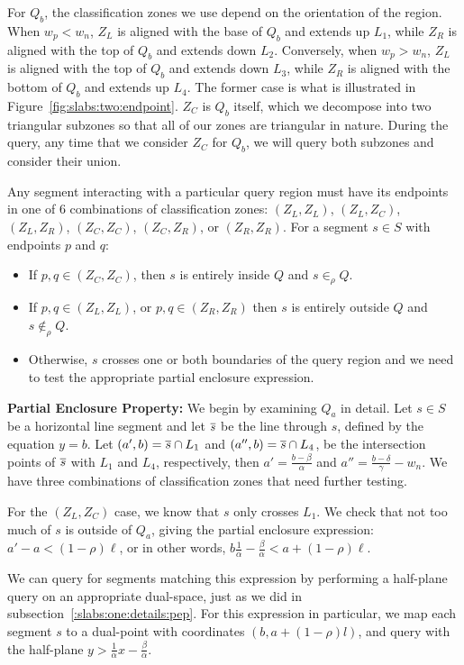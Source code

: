 For $Q_b$, the classification zones we use depend on the orientation of the region.
When $w_p < w_n$, $Z_L$ is aligned with the base of $Q_b$ and extends up $L_1$, while $Z_R$ is aligned with the top of $Q_b$ and extends down $L_2$.
Conversely, when $w_p > w_n$, $Z_L$ is aligned with the top of $Q_b$ and extends down $L_3$, while $Z_R$ is aligned with the bottom of $Q_b$ and extends up $L_4$.
The former case is what is illustrated in Figure~\ref{fig:slabs:two:endpoint}.
$Z_C$ is $Q_b$ itself, which we decompose into two triangular subzones so that all of our zones are triangular in nature.
During the query, any time that we consider $Z_C$ for $Q_b$, we will query both subzones and consider their union.

Any segment interacting with a particular query region must have its endpoints in one of 6 combinations of classification zones: $(Z_L, Z_L)$, $(Z_L, Z_C)$, $(Z_L, Z_R)$, $(Z_C,\allowbreak Z_C)$, $(Z_C, Z_R)$, or $(Z_R, Z_R)$. 
For a segment $s \in S$ with endpoints $p$ and $q$:
\begin{itemize}
\item If $p, q \in (Z_C, Z_C)$, then $s$ is entirely inside $Q$ and $s \in_\rho Q$.
\item If $p, q \in (Z_L, Z_L)$, or $p, q \in (Z_R, Z_R)$ then $s$ is entirely outside $Q$ and $s \not \in_\rho Q$.
\item Otherwise, $s$ crosses one or both boundaries of the query region and we need to test the appropriate partial enclosure expression.
\end{itemize}


{\bf Partial Enclosure Property:}
We begin by examining $Q_a$ in detail.
Let $s \in S$ be a horizontal line segment and let $\overline{s}$ be the line through $s$, defined by the equation $y = b$.
Let $(a', b) = \overline{s} \cap L_1$ and $(a'', b) = \overline{s} \cap L_4$, be the intersection points of $\overline{s}$ with $L_1$ and $L_4$, respectively, then $a' = \frac{b - \beta}{\alpha}$ and $a'' = \frac{b - \delta}{\gamma} - w_n$.
We have three combinations of classification zones that need further testing.

For the $(Z_L, Z_C)$ case, we know that $s$ only crosses $L_1$.
We check that not too much of $s$ is outside of $Q_a$, giving the  partial enclosure expression: $a' - a < (1 - \rho)\ell$, or in other words, 
$b \frac{1}{\alpha} - \frac{\beta}{\alpha} < a + (1 - \rho)\ell$.

\noindent We can query for segments matching this expression by performing a half-plane query on an appropriate dual-space, just as we did in subsection~\ref{:slabs:one:details:pep}. 
For this expression in particular, we map each segment $s$ to a dual-point with coordinates $(b, a + (1-\rho)l)$, and query with the half-plane $y > \frac{1}{\alpha} x - \frac{\beta}{\alpha}$.


